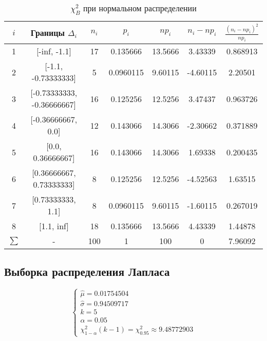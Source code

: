 \documentclass[12pt,a4paper]{article}
\begin{document}
\begin{table}[H]
    \centering
    \begin{tabular}{|c|c|c|c|c|c|c|}
    \hline
    $i$ & Границы $\Delta_i$ & $n_i$ & $p_i$ & $np_i$ & $n_i-np_i$ & $\frac{(n_i-np_i)^2}{np_i}$ \\ \hline
     1 & [-inf, -1.1]               &  17 & 0.135666  &  13.5666  &  3.43339 & 0.868913 \\ \hline
     2 & [-1.1, -0.73333333]        &   5 & 0.0960115 &   9.60115 & -4.60115 & 2.20501  \\ \hline
     3 & [-0.73333333, -0.36666667] &  16 & 0.125256  &  12.5256  &  3.47437 & 0.963726 \\ \hline
     4 & [-0.36666667, 0.0]         &  12 & 0.143066  &  14.3066  & -2.30662 & 0.371889 \\ \hline
     5 & [0.0, 0.36666667]          &  16 & 0.143066  &  14.3066  &  1.69338 & 0.200435 \\ \hline
     6 & [0.36666667, 0.73333333]   &   8 & 0.125256  &  12.5256  & -4.52563 & 1.63515  \\ \hline
     7 & [0.73333333, 1.1]          &   8 & 0.0960115 &   9.60115 & -1.60115 & 0.267019 \\ \hline
     8 & [1.1, inf]                 &  18 & 0.135666  &  13.5666  &  4.43339 & 1.44878  \\ \hline
     $\sum$ & -                          & 100 & 1         & 100       &  0       & 7.96092  \\ \hline
    \end{tabular} 
    \caption{$\chi^2_B$ при нормальном распределении}
\end{table}

\subsection{Выборка распределения Лапласа}
\begin{equation}
    \left\{
    \begin{array}{ll}
        \hat{\mu} = 0.01754504\\
        \hat{\sigma} = 0.94509717\\
        k = 5\\
        \alpha = 0.05\\
        \chi^2_{1 - \alpha}(k - 1)=\chi^2_{0.95} \approx 9.48772903
    \end{array}
    \right.
\end{equation}
\end{document}
